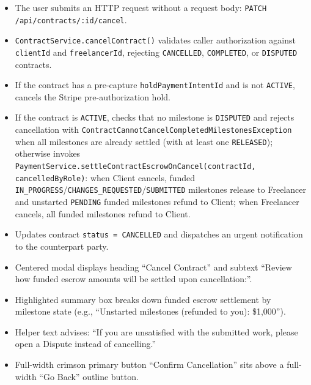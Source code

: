 \begin{itemize}[leftmargin=1.6em,topsep=3pt,itemsep=2pt,parsep=0pt,label=$\bullet$]
      \item The user submits an HTTP request without a request body: \texttt{PATCH /\allowbreak{}api/\allowbreak{}contracts/\allowbreak{}:\allowbreak{}id/\allowbreak{}cancel}.
      \item \texttt{ContractService.cancelContract()} validates caller authorization against \texttt{clientId} and \texttt{freelancerId}, rejecting \texttt{CANCELLED}, \texttt{COMPLETED}, or \texttt{DISPUTED} contracts.
      \item If the contract has a pre-capture \texttt{holdPaymentIntentId} and is not \texttt{ACTIVE}, cancels the Stripe pre-authorization hold.
      \item {\sloppy If the contract is \texttt{ACTIVE}, checks that no milestone is \texttt{DISPUTED} and rejects cancellation with \texttt{ContractCannotCancelCompletedMilestonesException} when all milestones are already settled (with at least one \texttt{RELEASED}); otherwise invokes \texttt{PaymentService.\allowbreak{}settleContractEscrowOnCancel(\allowbreak{}contractId, cancelledByRole)}: when Client cancels, funded \texttt{IN\_PROGRESS}/\texttt{CHANGES\_REQUESTED}/\texttt{SUBMITTED} milestones release to Freelancer and unstarted \texttt{PENDING} funded milestones refund to Client; when Freelancer cancels, all funded milestones refund to Client.\par}
      \item Updates contract \texttt{status = CANCELLED} and dispatches an urgent notification to the counterpart party.
\end{itemize}

\begin{itemize}[leftmargin=1.6em,topsep=3pt,itemsep=2pt,parsep=0pt,label=$\bullet$]
      \item Centered modal displays heading ``Cancel Contract'' and subtext ``Review how funded escrow amounts will be settled upon cancellation:''.
      \item Highlighted summary box breaks down funded escrow settlement by milestone state (e.g., ``Unstarted milestones (refunded to you): \$1,000'').
      \item Helper text advises: ``If you are unsatisfied with the submitted work, please open a Dispute instead of cancelling.''
      \item Full-width crimson primary button ``Confirm Cancellation'' sits above a full-width ``Go Back'' outline button.
\end{itemize}

